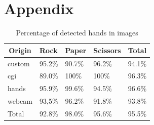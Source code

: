 \documentclass[a4paper]{article}
\begin{document}
\appendix

\section{Appendix}

\begin{table}[H]
\caption{Percentage of detected hands in images}
\centering
\label{tbl:img-hands_percentage}
\begin{tabular}{@{}lllll@{}}
\toprule
\multicolumn{1}{c}{Origin} & Rock   & Paper  & Scissors & Total  \\ \midrule
custom                     & 95.2\% & 90.7\% & 96.2\%   & 94.1\% \\
cgi                        & 89.0\% & 100\%  & 100\%    & 96.3\% \\
hands                      & 95.9\% & 99.6\% & 94.5\%   & 96.6\% \\
webcam                     & 93,5\% & 96.2\% & 91.8\%   & 93.8\% \\
Total                      & 92.8\% & 98.0\% & 95.6\%   & 95.5\% \\ \bottomrule
\end{tabular}
\end{table}
\end{document}
